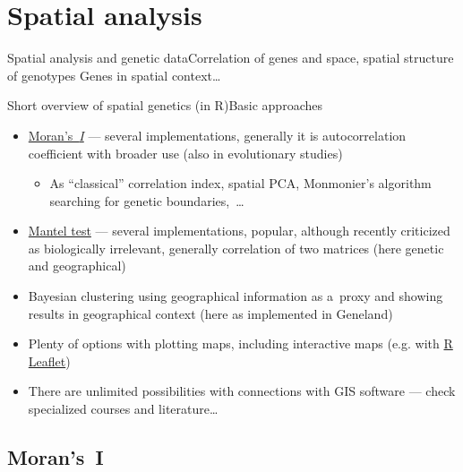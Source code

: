 \documentclass[compress, xelatex, 11pt, xcolor=svgnames, aspectratio=169,
	hyperref={
		bookmarks=true,
		unicode=true,
		colorlinks=true,
		pdftitle={Molecular data in R},
		plainpages=false,
		pdfauthor={Vojtech Zeisek},
		pdfsubject={Course about phylogeny and evolution in R},
		pdfcreator={XeLaTeX},
		pdfkeywords={R, evolution, phylogeny, molecular data},
		linkcolor=Crimson, %
		anchorcolor=Magenta, %
		citecolor=Magenta, %
		filecolor=Magenta, %
		menucolor=Magenta, %
		urlcolor=DodgerBlue, %
		},
	url={hyphens, lowtilde} %
	]{beamer}
\begin{document}
\section{Spatial analysis}

\begin{frame}[fragile]{Spatial analysis and genetic data}{Correlation of genes and space, spatial structure of genotypes}
	Genes in spatial context\ldots
	\tableofcontents[currentsection, sectionstyle=show/hide, hideothersubsections]
\end{frame}

\begin{frame}{Short overview of spatial genetics (in R)}{Basic approaches}
	\begin{itemize}
		\item \href{https://en.wikipedia.org/wiki/Moran\%27s_I}{Moran's~\textit{I}} --- several implementations, generally it is autocorrelation coefficient with broader use (also in evolutionary studies)
		\begin{itemize}
			\item As \enquote{classical} correlation index, spatial PCA, Monmonier's algorithm searching for genetic boundaries,~\ldots
		\end{itemize}
		\item \href{https://en.wikipedia.org/wiki/Mantel_test}{Mantel test} --- several implementations, popular, although recently criticized as biologically irrelevant, generally correlation of two matrices (here genetic and geographical)
		\item Bayesian clustering using geographical information as a~proxy and showing results in geographical context (here as implemented in Geneland)
		\item Plenty of options with plotting maps, including interactive maps (e.g. with \href{https://rstudio.github.io/leaflet/}{R Leaflet})
		\item There are unlimited possibilities with connections with GIS software --- check specialized courses and literature\ldots
	\end{itemize}
\end{frame}

\subsection{Moran's~I}
\end{document}
